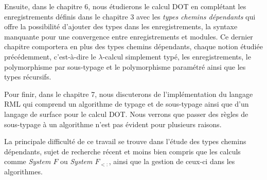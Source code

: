Ensuite, dans le chapitre 6, nous étudierons le calcul DOT en complétant les
enregistrements définis dans le chapitre 3 avec les \textit{types chemins
dépendants} qui offre la possibilité d'ajouter des types dans les
enregistrements, la syntaxe manquante pour une
convergence entre enregistrements et modules. Ce dernier chapitre comportera en
plus des types chemins dépendants, chaque notion étudiée précédemment,
c'est-à-dire le $\lambda$-calcul simplement typé, les
enregistrements, le polymorphisme par sous-typage et le polymorphisme paramétré
ainsi que les types récursifs.

Pour finir, dans le chapitre 7, nous discuterons de l'implémentation du langage
RML\cite{rml-github} qui comprend un algorithme de typage et de sous-typage
ainsi que d'un langage de surface pour le
calcul DOT. Nous verrons que passer des règles de sous-typage à un algorithme
n'est pas évident pour plusieurs raisons.


La principale difficulté de ce travail se trouve dans l'étude des types
chemins dépendants, sujet de recherche récent et moins bien compris que les
calculs comme \textit{System $F$} ou \textit{System $F_{<:}$}, ainsi que
la gestion de ceux-ci dans les algorithmes.
